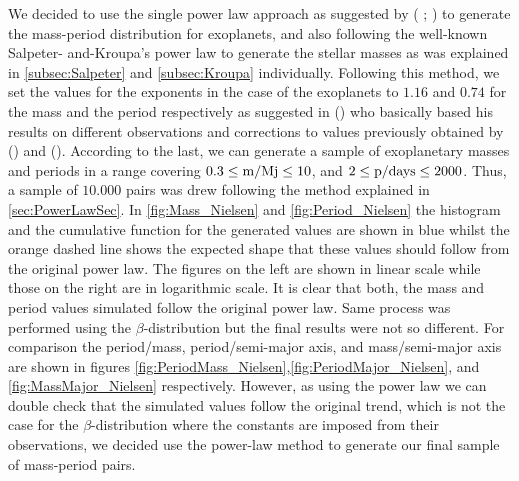 We decided to use the single power law approach as suggested by ( \citeyear{2008PASP..120..531C};  \citeyear{2006ApJ...646..505B}) to generate the mass-period distribution for exoplanets, and also following the well-known Salpeter- and-Kroupa's power law to generate the stellar masses as was explained in \autoref{subsec:Salpeter} and \autoref{subsec:Kroupa} individually. Following this method, we set the values for the exponents in the case of the exoplanets to $1.16$ and $0.74$ for the mass and the period respectively as suggested in  (\citeyear{2010EAS....41..107N}) who basically based his results on different observations and corrections to values previously obtained by  (\citeyear{2008PASP..120..531C}) and  (\citeyear{2006ApJ...646..505B}). According to the last, we can generate a sample of exoplanetary masses and periods in a range covering $0.3 \leq \textnormal{m/Mj} \leq 10$, and $2 \leq \textnormal{p/days} \leq 2000$. Thus, a sample of $10.000$ pairs was drew following the method explained in \autoref{sec:PowerLawSec}. In \autoref{fig:Mass_Nielsen} and \autoref{fig:Period_Nielsen} the histogram and the cumulative function for the generated values are shown in blue whilst the orange dashed line shows the expected shape that these values should follow from the original power law. The figures on the left are shown in linear scale while those on the right are in logarithmic scale. It is clear that both, the mass and period values simulated follow the original power law. Same process was performed using the $\beta$-distribution but the final results were not so different. For comparison the period/mass, period/semi-major axis, and mass/semi-major axis are shown in figures \autoref{fig:PeriodMass_Nielsen},\autoref{fig:PeriodMajor_Nielsen}, and  \autoref{fig:MassMajor_Nielsen} respectively. However, as using the power law we can double check that the simulated values follow the original trend, which is not the case for the $\beta$-distribution where the constants are imposed from their observations, we decided use the power-law method to generate our final sample of mass-period pairs.\\ 

